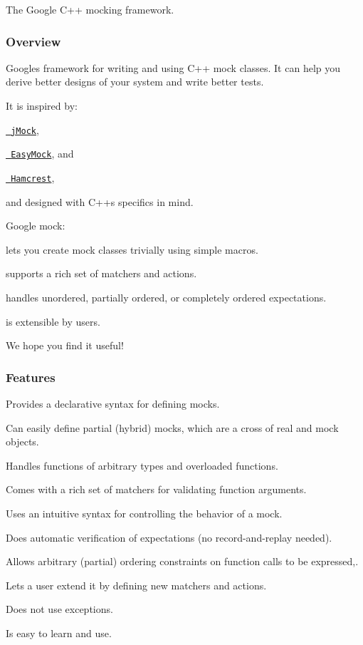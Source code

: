 The Google C++ mocking framework.

\subsubsection*{Overview}

Google\textquotesingle{}s framework for writing and using C++ mock classes. It can help you derive better designs of your system and write better tests.

It is inspired by\+:


\begin{DoxyItemize}
\item \href{http://www.jmock.org/}{\texttt{ j\+Mock}},
\item \href{http://www.easymock.org/}{\texttt{ Easy\+Mock}}, and
\item \href{http://code.google.com/p/hamcrest/}{\texttt{ Hamcrest}},
\end{DoxyItemize}

and designed with C++\textquotesingle{}s specifics in mind.

Google mock\+:


\begin{DoxyItemize}
\item lets you create mock classes trivially using simple macros.
\item supports a rich set of matchers and actions.
\item handles unordered, partially ordered, or completely ordered expectations.
\item is extensible by users.
\end{DoxyItemize}

We hope you find it useful!

\subsubsection*{Features}


\begin{DoxyItemize}
\item Provides a declarative syntax for defining mocks.
\item Can easily define partial (hybrid) mocks, which are a cross of real and mock objects.
\item Handles functions of arbitrary types and overloaded functions.
\item Comes with a rich set of matchers for validating function arguments.
\item Uses an intuitive syntax for controlling the behavior of a mock.
\item Does automatic verification of expectations (no record-\/and-\/replay needed).
\item Allows arbitrary (partial) ordering constraints on function calls to be expressed,.
\item Lets a user extend it by defining new matchers and actions.
\item Does not use exceptions.
\item Is easy to learn and use.
\end{DoxyItemize}

